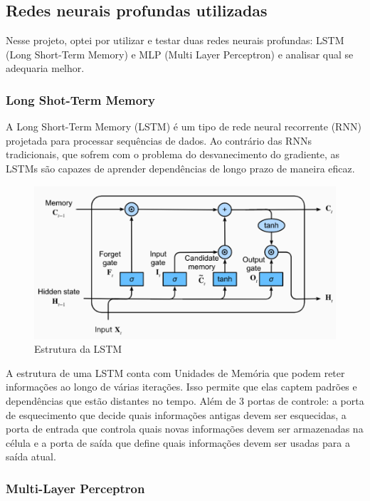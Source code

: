 \documentclass[conference]{IEEEtran}
\begin{document}
\subsection{Redes neurais profundas utilizadas}

Nesse projeto, optei por utilizar e testar duas redes neurais profundas: LSTM (Long Short-Term Memory) e MLP (Multi Layer Perceptron) e analisar qual se adequaria melhor.

\subsubsection{Long Shot-Term Memory}

\indent A Long Short-Term Memory (LSTM) é um tipo de rede neural recorrente (RNN) projetada para processar sequências de dados. Ao contrário das RNNs tradicionais, que sofrem com o problema do desvanecimento do gradiente, as LSTMs são capazes de aprender dependências de longo prazo de maneira eficaz.

\begin{figure}[h!]
    \centering
    \includegraphics[width=\linewidth]{lstm.png}
    \caption{Estrutura da LSTM}
    \label{fig:lstm}
\end{figure}

\indent A estrutura de uma LSTM conta com Unidades de Memória que podem reter informações ao longo de várias iterações. Isso permite que elas captem padrões e dependências que estão distantes no tempo. Além de 3 portas de controle: a porta de esquecimento que decide quais informações antigas devem ser esquecidas, a porta de entrada que controla quais novas informações devem ser armazenadas na célula e a porta de saída que define quais informações devem ser usadas para a saída atual.

\subsubsection{Multi-Layer Perceptron}
\end{document}
